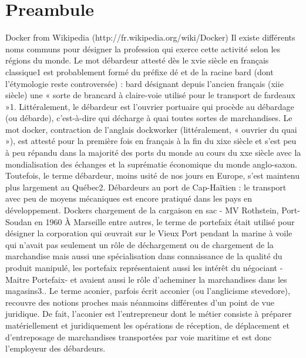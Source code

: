 \documentclass{42}
\begin{document}
\chapter{Preambule}
Docker from Wikipedia (http://fr.wikipedia.org/wiki/Docker)
\newline
\newline
Il existe différents noms communs pour désigner la profession qui exerce cette activité selon les régions du monde.
\newline
\newline
Le mot débardeur attesté dès le xvie siècle en français classique1 est probablement formé du préfixe dé et de la racine bard (dont l'étymologie reste controversée) : bard désignant depuis l'ancien français (xiie siècle) une « sorte de brancard à claire-voie utilisé pour le transport de fardeaux »1. Littéralement, le débardeur est l'ouvrier portuaire qui procède au débardage (ou débarde), c'est-à-dire qui décharge à quai toutes sortes de marchandises.
\newline
\newline
Le mot docker, contraction de l'anglais dockworker (littéralement, « ouvrier du quai »), est attesté pour la première fois en français à la fin du xixe siècle et s'est peu à peu répandu dans la majorité des ports du monde au cours du xxe siècle avec la mondialisation des échanges et la suprématie économique du monde anglo-saxon. Toutefois, le terme débardeur, moins usité de nos jours en Europe, s'est maintenu plus largement au Québec2.
\newline
\newline
Débardeurs au port de Cap-Haïtien : le transport avec peu de moyens mécaniques est encore pratiqué dans les pays en développement.
\newline
\newline
Dockers chargement de la cargaison en sac - MV Rothstein, Port-Soudan en 1960
À Marseille entre autres, le terme de portefaix était utilisé pour désigner la corporation qui œuvrait sur le Vieux Port pendant la marine à voile qui n'avait pas seulement un rôle de déchargement ou de chargement de la marchandise mais aussi une spécialisation dans connaissance de la qualité du produit manipulé, les portefaix représentaient aussi les intérêt du négociant -Maitre Portefaix- et avaient aussi le rôle d'acheminer la marchandises dans les magasins3..
\newline
\newline
Le terme aconier, parfois écrit acconier (ou l'anglicisme stevedore), recouvre des notions proches mais néanmoins différentes d'un point de vue juridique. De fait, l'aconier est l'entrepreneur dont le métier consiste à préparer matériellement et juridiquement les opérations de réception, de déplacement et d’entreposage de marchandises transportées par voie maritime et est donc l'employeur des débardeurs.
\end{document}
